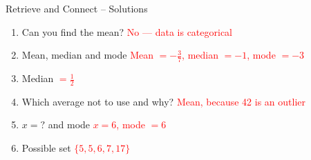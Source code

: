 \documentclass{beamer}
\begin{document}
\begin{frame}{Retrieve and Connect -- Solutions}
\vspace{-0.8em}

\footnotesize
\begin{enumerate}\itemsep2pt
  \item Can you find the mean?  
        \textcolor{red}{No — data is categorical}
  \item Mean, median and mode  
        \textcolor{red}{Mean $=-\frac{3}{7}$, median $=-1$, mode $=-3$}
  \item Median  
        \textcolor{red}{$=\frac{1}{2}$}
  \item Which average not to use and why?  
        \textcolor{red}{Mean, because 42 is an outlier}
  \item $x=?$ and mode  
        \textcolor{red}{$x=6$, mode $=6$}
  \item Possible set  
        \textcolor{red}{$\{5,5,6,7,17\}$}
\end{enumerate}
\end{frame}
\end{document}

